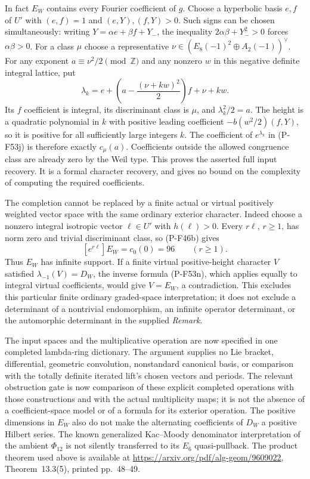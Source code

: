 In fact $E_W$ contains every Fourier coefficient of $g$.
Choose a hyperbolic basis $e,f$ of $U'$ with
$(e,f)=1$ and $(e,Y),(f,Y)>0$. Such signs can be chosen
simultaneously: writing $Y=\alpha e+\beta f+Y_-$,
the inequality $2\alpha\beta+Y_-^2>0$ forces
$\alpha\beta>0$. For a class $\mu$ choose a representative
$\nu\in (E_8(-1)^2\oplus A_2(-1))^\vee$.
For any exponent $a\equiv\nu^2/2\pmod{\mathbb Z}$ and
any nonzero $w$ in this negative definite integral lattice,
put
\[
 \lambda_k=e+
       \left(a-\frac{(\nu+kw)^2}{2}\right)f+\nu+kw.
 \tag{P-F53o}
\]
Its $f$ coefficient is integral, its discriminant class
is $\mu$, and $\lambda_k^2/2=a$.
The height is a quadratic polynomial in $k$ with positive
leading coefficient $-b(w^2/2)(f,Y)$, so it is positive
for all sufficiently large integers $k$.
The coefficient of $e^{\lambda_k}$ in (P-F53j) is
therefore exactly $c_\mu(a)$. Coefficients outside the
allowed congruence class are already zero by the Weil type.
This proves the asserted full input recovery. It is a
formal character recovery, and gives no bound on the
complexity of computing the required coefficients.

The completion cannot be replaced by a finite actual
or virtual positively weighted vector space with the
same ordinary exterior character. Indeed choose a
nonzero integral isotropic vector $\ell\in U'$ with
$h(\ell)>0$. Every $r\ell$, $r\ge1$, has norm zero
and trivial discriminant class, so (P-F46b) gives
\[
       [e^{r\ell}]E_W=c_0(0)=96\qquad(r\ge1).
 \tag{P-F53p}
\]
Thus $E_W$ has infinite support. If a finite virtual
positive-height character $V$ satisfied
$\lambda_{-1}(V)=D_W$, the inverse formula (P-F53n),
which applies equally to integral virtual coefficients,
would give $V=E_W$, a contradiction. This excludes this
particular finite ordinary graded-space interpretation;
it does not exclude a determinant of a nontrivial
endomorphism, an infinite operator determinant, or the
automorphic determinant in the supplied \emph{Remark}.

The input spaces and the multiplicative operation are
now specified in one completed lambda-ring dictionary.
The argument supplies no Lie bracket, differential,
geometric convolution, nonstandard canonical basis,
or comparison with the totally definite iterated lift's
chosen vectors and periods. The relevant obstruction
gate is now comparison of these explicit completed
operations with those constructions and with the
actual multiplicity maps; it is not the absence of a
coefficient-space model or of a formula for its exterior
operation. The positive dimensions in $E_W$ also do not
make the alternating coefficients of $D_W$ a positive
Hilbert series. The known generalized Kac--Moody
denominator interpretation of the ambient $\Phi_{12}$
is not silently transferred to its $E_6$ quasi-pullback.
The product theorem used above is available at
\url{https://arxiv.org/pdf/alg-geom/9609022},
Theorem~13.3(5), printed pp.~48--49.
